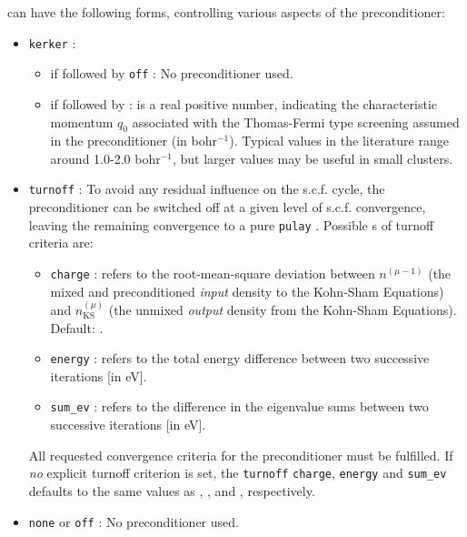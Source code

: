  can have the following forms, controlling various
aspects of the preconditioner: 
\begin{itemize}
  \item \texttt{kerker} :
    \begin{itemize}
      \item if followed by \texttt{off} : No preconditioner used.
      \item if followed by  :  is a real
        positive number, indicating the characteristic momentum $q_0$
        associated with the Thomas-Fermi type screening assumed in the
        preconditioner (in bohr$^{-1}$). Typical values in the
        literature range around 1.0-2.0 bohr$^{-1}$, but larger values
        may be useful in small clusters.
    \end{itemize}
  \item \texttt{turnoff} : To avoid any residual influence on the
    s.c.f. cycle, the preconditioner can be switched off at a given
    level of s.c.f. convergence, leaving the remaining convergence to
    a pure \texttt{pulay} . Possible s of
    turnoff criteria are:
    \begin{itemize}
      \item \texttt{charge} :  refers to the
        root-mean-square deviation between $n^{(\mu-1)}$ (the mixed
        and preconditioned \emph{input} density to the Kohn-Sham
        Equations) and $n_\text{KS}^{(\mu)}$ (the unmixed
        \emph{output} density from the Kohn-Sham Equations). Default:
        .
      \item \texttt{energy} :  refers to the total
        energy difference between two successive iterations [in eV].
      \item \texttt{sum\_ev} :  refers to the 
        difference in the eigenvalue sums between two successive
        iterations [in eV]. 
    \end{itemize}  
    All requested convergence criteria for the preconditioner must be
    fulfilled. If \emph{no} explicit turnoff criterion is set, the 
     \texttt{turnoff} \texttt{charge},
    \texttt{energy} and \texttt{sum\_ev} defaults
    to the same values as ,
    , and ,
    respectively. 
  \item \texttt{none} or \texttt{off} : No preconditioner used.
\end{itemize}

